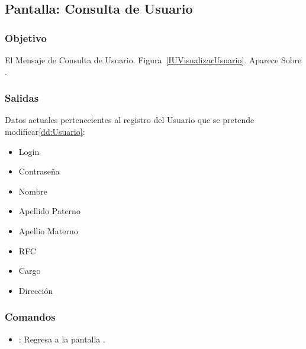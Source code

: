 \subsection{Pantalla: Consulta de Usuario}
\subsubsection{Objetivo}
El Mensaje de Consulta de Usuario. Figura~\ref{IUVisualizarUsuario}. Aparece Sobre .



\subsubsection{Salidas}
Datos actuales pertenecientes al registro del Usuario que se pretende modificar\ref{dd:Usuario}:
\begin{itemize}
 \item Login
 \item Contraseña
 \item Nombre
 \item Apellido Paterno
 \item Apellio Materno
 \item RFC
 \item Cargo
 \item Dirección
\end{itemize}

\subsubsection{Comandos}
\begin{itemize}
 \item {}: Regresa a la pantalla .
\end{itemize}





